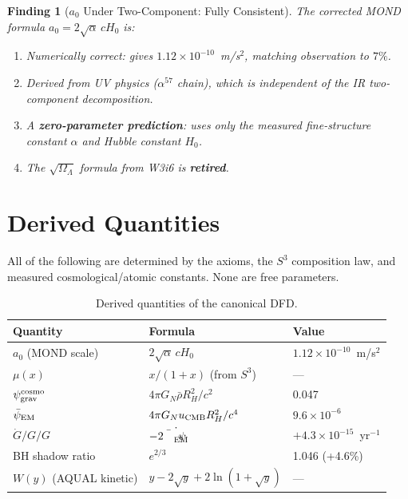 \documentclass[11pt]{article}
\newtheorem{finding}{Finding}
\newcommand{\ee}[1]{\times 10^{#1}}
\newcommand{\psigrav}{\psi_{\rm grav}}
\newcommand{\psiEM}{\bar{\psi}_{\rm EM}}
\newcommand{\GN}{G_N}
\newcommand{\Gdot}{\dot{G}/G}
\newcommand{\aM}{a_0}
\newcommand{\Hzero}{H_0}
\newcommand{\mufd}{\mu}
\newcommand{\RH}{R_H}
\newcommand{\OmL}{\Omega_\Lambda}
\begin{document}
\begin{finding}[$\aM$ Under Two-Component: Fully Consistent]
\label{find:a0-twocomp}
The corrected MOND formula $\aM = 2\sqrt{\alpha}\,c\Hzero$ is:
\begin{enumerate}[nosep]
\item Numerically correct: gives $1.12\ee{-10}$~m/s$^2$, matching
  observation to $7\%$.
\item Derived from UV physics ($\alpha^{57}$ chain), which is
  independent of the IR two-component decomposition.
\item A \textbf{zero-parameter prediction}: uses only the measured
  fine-structure constant $\alpha$ and Hubble constant $\Hzero$.
\item The $\sqrt{\OmL}$ formula from W3i6 is \textbf{retired}.
\end{enumerate}
\end{finding}


\section{Derived Quantities}
\label{sec:derived}

All of the following are determined by the axioms, the $S^3$ composition
law, and measured cosmological/atomic constants. None are free
parameters.

\begin{table}[H]
\centering
\caption{Derived quantities of the canonical DFD.}
\label{tab:derived}
\begin{tabular}{lll}
\toprule
\textbf{Quantity} & \textbf{Formula} & \textbf{Value} \\
\midrule
$\aM$ (MOND scale) & $2\sqrt{\alpha}\,c\Hzero$ & $1.12\ee{-10}$~m/s$^2$ \\
$\mufd(x)$ & $x/(1+x)$ (from $S^3$) & --- \\
$\psigrav^{\rm cosmo}$ & $4\pi\GN\bar{\rho}\RH^2/c^2$ & 0.047 \\
$\psiEM$ & $4\pi\GN u_{\rm CMB}\RH^2/c^4$ & $9.6\ee{-6}$ \\
$\Gdot/G$ & $-2\dot{\psiEM}$ & $+4.3\ee{-15}$~yr$^{-1}$ \\
BH shadow ratio & $e^{2/3}$ & 1.046 (+4.6\%) \\
$W(y)$ (AQUAL kinetic) & $y - 2\sqrt{y} + 2\ln(1+\sqrt{y})$ & --- \\
\bottomrule
\end{tabular}
\end{table}
\end{document}
